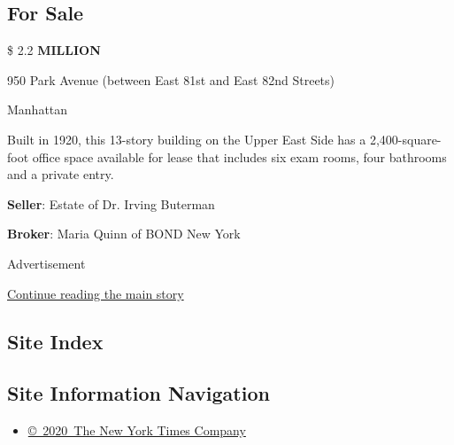 \hypertarget{for-sale}{%
\subsection{For Sale}\label{for-sale}}

\$ 2.2 \textbf{MILLION}

950 Park Avenue (between East 81st and East 82nd Streets)

Manhattan

Built in 1920, this 13-story building on the Upper East Side has a
2,400-square-foot office space available for lease that includes six
exam rooms, four bathrooms and a private entry.

\textbf{Seller}: Estate of Dr. Irving Buterman

\textbf{Broker}: Maria Quinn of BOND New York

Advertisement

\protect\hyperlink{after-bottom}{Continue reading the main story}

\hypertarget{site-index}{%
\subsection{Site Index}\label{site-index}}

\hypertarget{site-information-navigation}{%
\subsection{Site Information
Navigation}\label{site-information-navigation}}

\begin{itemize}
\tightlist
\item
  \href{https://help.nytimes3xbfgragh.onion/hc/en-us/articles/115014792127-Copyright-notice}{©~2020~The
  New York Times Company}
\end{itemize}

